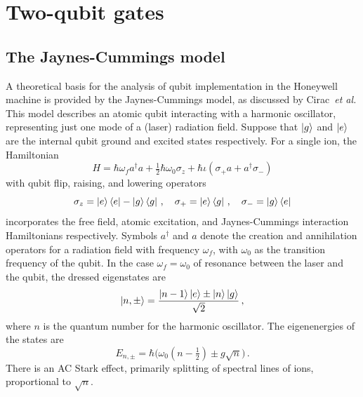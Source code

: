 \documentclass[12pt,a4paper]{amsart}
\numberwithin{equation}{section}
\theoremstyle{plain}
\theoremstyle{definition}
\begin{document}
\section{Two-qubit gates}








\subsection{The Jaynes-Cummings model}





A theoretical basis for the analysis of qubit implementation in the Honeywell machine is provided by the Jaynes-Cummings model, as discussed by Cirac~\textit{et al.} \cite{fundQuanFock} This model describes an atomic qubit interacting with a harmonic oscillator, representing just one mode of a (laser) radiation field. Suppose that $\ket{g}$ and $\ket{e}$ are the internal qubit ground and excited states respectively. For a single ion, the Hamiltonian 
$$
H = \hbar \omega_f a^{\dagger}a + \tfrac{1}{2}\hbar\omega_0 \sigma_z + 
\hbar
\iota
(\sigma_+a+a^{\dagger}\sigma_-)
$$
with qubit flip, raising, and lowering operators
$$
\sigma_z=\ket e\bra e -\ket g\bra g\,,
\quad
\sigma_+=\ket e\bra g\,,
\quad
\sigma_-=\ket g\bra e
$$
incorporates the free field, atomic excitation, and Jaynes-Cummings interaction Hamiltonians respectively. Symbols $a^{\dagger}$ and $a$ denote the creation and annihilation operators for a radiation field with frequency $\omega_f$, with $\omega_0$ as the transition frequency of the qubit. 
In the case $\omega_f=\omega_0$ of resonance between the laser and the qubit, the dressed eigenstates are 
$$
\ket{n,\pm}=
\frac{\ket{n-1}\ket{e} \pm \ket{n}\ket{g}}{\sqrt{2}}\,,
$$
where $n$ is the quantum number for the harmonic oscillator. The eigenenergies of the states are
$$
E_{n,\pm} = \hbar \big(\omega_0 (n - \tfrac{1}{2}) \pm g\sqrt{n}\big) \,.
$$
There is an AC Stark effect, primarily splitting of spectral lines of ions, proportional to $\sqrt{n}$. 
\end{document}
